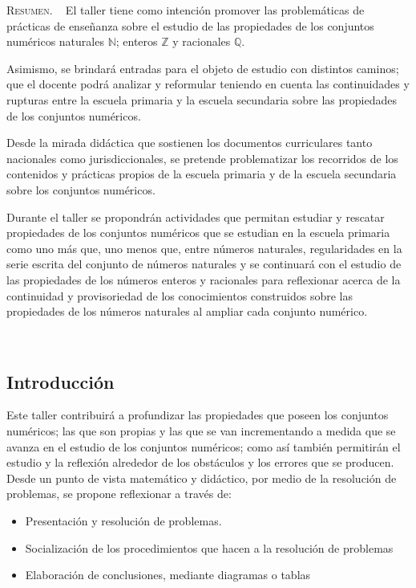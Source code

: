 \begin{center}
	\begin{minipage}{0.75\linewidth} \small
		\textsc{Resumen}. ~
		El taller tiene como intención promover las problemáticas de prácticas de enseñanza sobre el estudio de las propiedades de los conjuntos numéricos naturales $\mathbb{N}$; enteros $\mathbb{Z}$ y racionales $\mathbb{Q}$.
		
		Asimismo, se brindará entradas para el objeto de estudio con distintos caminos; que el docente podrá analizar y reformular teniendo en cuenta las continuidades y rupturas entre la escuela primaria y la escuela secundaria sobre las propiedades de los conjuntos numéricos.
		
		Desde la mirada didáctica que sostienen los documentos curriculares tanto nacionales como jurisdiccionales, se pretende problematizar los recorridos de los contenidos y prácticas propios de la escuela primaria y de la escuela secundaria sobre los conjuntos numéricos.
		
		Durante el taller se propondrán actividades que permitan estudiar y rescatar propiedades de los conjuntos numéricos que se estudian en la escuela primaria como uno más que, uno menos que, entre números naturales, regularidades en la serie escrita del conjunto de números naturales y se continuará con el estudio de las propiedades de los números enteros y racionales para reflexionar acerca de la continuidad y provisoriedad de los conocimientos construidos sobre las propiedades de los números naturales al ampliar cada conjunto numérico.
	\end{minipage}\\
\end{center}

\subsection{Introducción}

Este taller contribuirá a profundizar las propiedades que poseen los conjuntos numéricos; las que son propias y las que se van incrementando a medida que se avanza en el estudio de los conjuntos numéricos; como así también permitirán el estudio y la reflexión alrededor de los obstáculos y los errores que se producen. Desde un punto de vista matemático y didáctico, por medio de la resolución de problemas, se propone reflexionar a través de:
\begin{itemize}
	\item Presentación y resolución de problemas.
	\item Socialización de los procedimientos que hacen a la resolución de problemas
	\item Elaboración de conclusiones, mediante diagramas o tablas
\end{itemize}

